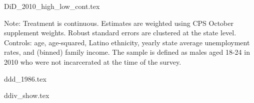 {DiD_2010_high_low_cont.tex}
\begin{footnotesize}
  \noindent Note: Treatment is continuous. Estimates are weighted using CPS October supplement weights. Robust standard errors are clustered at the state level. Controls: age, age-squared, Latino ethnicity, yearly state average unemployment rates, and (binned) family income. The sample is defined as males aged 18-24 in 2010 who were not incarcerated at the time of the survey.
\end{footnotesize}
\clearpage

{ddd_1986.tex}

{ddiv_show.tex}